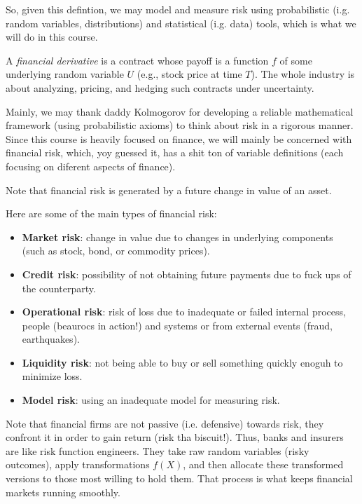 So, given this defintion, we may model and measure risk using probabilistic (i.g. random variables, distributions) and statistical (i.g. data) tools, which is what we will do in this course. 

\begin{definition}
    A \textit{financial derivative} is a contract whose payoff is a function $f$ of some underlying random variable $U$ (e.g., stock price at time $T$). The whole industry is about analyzing, pricing, and hedging such contracts under uncertainty.
\end{definition}

Mainly, we may thank daddy Kolmogorov for developing a reliable mathematical framework (using probabilistic axioms) to think about risk in a rigorous manner. Since this course is heavily focused on finance, we will mainly be concerned with financial risk, which, yoy guessed it, has a shit ton of
variable definitions (each focusing on diferent aspects of finance).

\begin{remark}
    Note that financial risk is generated by a future change in value of an asset.
\end{remark}

\vspace{0.2cm}

Here are some of the main types of financial risk:

\begin{itemize}
    \item \textbf{Market risk}: change in value due to changes in underlying components (such as
    stock, bond, or commodity prices).
    \item \textbf{Credit risk}: possibility of not obtaining future payments due to fuck ups of the counterparty.
    \item \textbf{Operational risk}: risk of loss due to inadequate or failed internal process, people (beaurocs in action!) and systems  or from external events (fraud, earthquakes).
    \item \textbf{Liquidity risk}: not being able to buy or sell something quickly enoguh to minimize loss.
    \item \textbf{Model risk}: using an inadequate model for measuring risk.
\end{itemize}

\vspace{0.2cm}

Note that financial firms are not passive (i.e. defensive) towards risk, they confront it in order to gain return (risk tha biscuit!). Thus, banks and insurers are like risk function engineers. They take raw random variables (risky outcomes), apply transformations $f(X)$,
 and then allocate these transformed versions to those most willing to hold them. That process is what keeps financial markets running smoothly.

